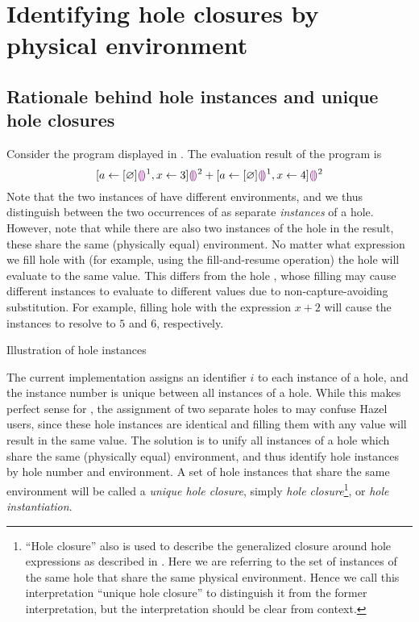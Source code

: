 \chapter{Identifying hole closures by physical environment}
\label{sec:renumbering}

\section{Rationale behind hole instances and unique hole closures}
\label{sec:instance-illustration}

Consider the program displayed in . The evaluation result of the program is \[
  [a\leftarrow[\varnothing]\textcolor{violet}{\llparenthesis}\textcolor{violet}{\rrparenthesis}^1,x\leftarrow 3]\textcolor{violet}{\llparenthesis}\textcolor{violet}{\rrparenthesis}^2
  + [a\leftarrow[\varnothing]\textcolor{violet}{\llparenthesis}\textcolor{violet}{\rrparenthesis}^1,x\leftarrow 4]\textcolor{violet}{\llparenthesis}\textcolor{violet}{\rrparenthesis}^2
\] Note that the two instances of  have different environments, and we thus distinguish between the two occurrences of  as separate \textit{instances} of a hole. However, note that while there are also two instances of the hole  in the result, these share the same (physically equal) environment. No matter what expression we fill hole  with (for example, using the fill-and-resume operation) the hole will evaluate to the same value. This differs from the hole , whose filling may cause different instances to evaluate to different values due to non-capture-avoiding substitution. For example, filling hole  with the expression $x+2$ will cause the instances to resolve to $5$ and $6$, respectively.

\begin{listing}
  \caption{Illustration of hole instances}
  \label{fig:instance-illustration}
\end{listing}

The current implementation assigns an identifier $i$ to each instance of a hole, and the instance number is unique between all instances of a hole. While this makes perfect sense for , the assignment of two separate holes to  may confuse Hazel users, since these hole instances are identical and filling them with any value will result in the same value. The solution is to unify all instances of a hole which share the same (physically equal) environment, and thus identify hole instances by hole number and environment. A set of hole instances that share the same environment will be called a \textit{unique hole closure}, simply \textit{hole closure}\footnote{``Hole closure'' also is used to describe the generalized closure around hole expressions as described in . Here we are referring to the set of instances of the same hole that share the same physical environment. Hence we call this interpretation ``unique hole closure'' to distinguish it from the former interpretation, but the interpretation should be clear from context.}, or \textit{hole instantiation}.

